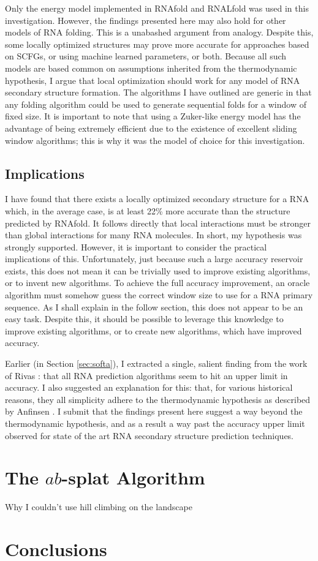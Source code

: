 \documentclass{cshonours}
\begin{document}
Only the energy model implemented in RNAfold and RNALfold was used in this investigation. However, the findings presented here may also hold for other models of RNA folding. This is a unabashed argument from analogy. Despite this, some locally optimized structures may prove more accurate for approaches based on SCFGs, or using machine learned parameters, or both. Because all such models are based common on assumptions inherited from the thermodynamic hypothesis, I argue that local optimization should work for any model of RNA secondary structure formation. The algorithms I have outlined are generic in that any folding algorithm could be used to generate sequential folds for a window of fixed size. It is important to note that using a Zuker-like energy model has the advantage of being extremely efficient due to the existence of excellent sliding window algorithms; this is why it was the model of choice for this investigation.

\subsection{Implications}

I have found that there exists a locally optimized secondary structure for a RNA which, in the average case, is at least 22\% more accurate than the structure predicted by RNAfold. It follows directly that local interactions must be stronger than global interactions for many RNA molecules. In short, my hypothesis was strongly supported. However, it is important to consider the practical implications of this. Unfortunately, just because such a large accuracy reservoir exists, this does not mean it can be trivially used to improve existing algorithms, or to invent new algorithms. To achieve the full accuracy improvement, an oracle algorithm must somehow guess the correct window size to use for a RNA primary sequence. As I shall explain in the follow section, this does not appear to be an easy task. Despite this, it should be possible to leverage this knowledge to improve existing algorithms, or to create new algorithms, which have improved accuracy. 

Earlier (in Section \ref{sec:softa}), I extracted a single, salient finding from the work of Rivas \cite{rivas2013four}: that all RNA prediction algorithms seem to hit an upper limit in accuracy. I also suggested an explanation for this: that, for various historical reasons, they all simplicity adhere to the thermodynamic hypothesis as described by Anfinsen \cite{anfinsen1973principles}. I submit that the findings present here suggest a way beyond the thermodynamic hypothesis, and as a result a way past the accuracy upper limit observed for state of the art RNA secondary structure prediction techniques.


\section{The $ab$-splat Algorithm}

Why I couldn't use hill climbing on the landscape

\section{Conclusions}







\end{document}

